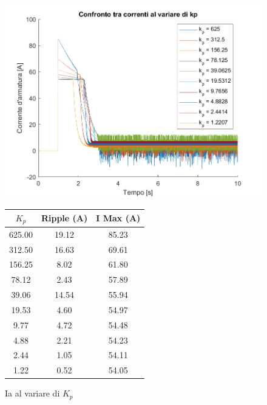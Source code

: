 \documentclass[a4paper,12pt]{article}
\begin{document}
\begin{figure}[h!]
\centering
\begin{minipage}{0.60\textwidth}
    \centering
    \includegraphics[width=\linewidth]{Immagini/PlotMatlab/confrontoCorrentiKp.png}
    \caption{Ia al variare di $K_p$}
    \label{fig:andamento_kp}
\end{minipage}
\hfill
\begin{minipage}{0.38\textwidth}
    \centering
    \small
    \begin{tabular}{|c|c|c|}
        \hline
        \textbf{$K_p$} & \textbf{Ripple (A)} & \textbf{I Max (A)} \\
        \hline
        625.00 & 19.12 & 85.23 \\
        312.50 & 16.63 & 69.61 \\
        156.25 & 8.02  & 61.80 \\
        78.12  & 2.43  & 57.89 \\
        39.06  & 14.54 & 55.94 \\
        19.53  & 4.60  & 54.97 \\
        9.77   & 4.72  & 54.48 \\
        4.88   & 2.21  & 54.23 \\
        2.44   & 1.05  & 54.11 \\
        1.22   & 0.52  & 54.05 \\
        \hline
    \end{tabular}
    \label{tab:iterazioni_kp}
\end{minipage}
\end{figure}
\end{document}
